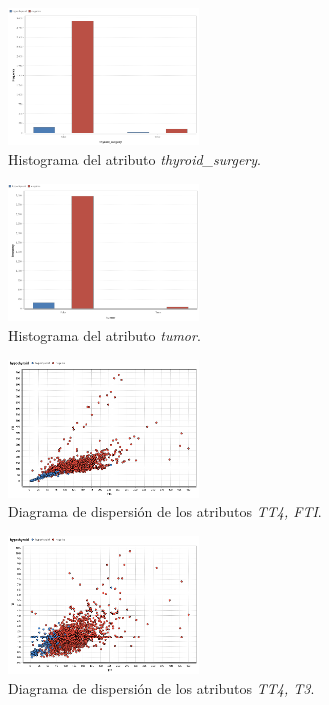 \documentclass[osajnl,twocolumn,showpacs,superscriptaddress,10pt,floatfix]{revtex4-1} %
\begin{document}
\begin{figure}[H]
    \centering
    \includegraphics[width=0.45\textwidth]{analysis/histogram_thyroid_surgery}
    \caption{Histograma del atributo \textit{thyroid\_surgery}.}
    \label{figure:thyroid_surgery}
\end{figure}

\begin{figure}[H]
    \centering
    \includegraphics[width=0.45\textwidth]{analysis/histogram_tumor}
    \caption{Histograma del atributo \textit{tumor}.}
    \label{figure:tumor}
\end{figure}

\begin{figure}[H]
    \centering
    \includegraphics[width=0.45\textwidth]{analysis/scatter_TT4_FTI}
    \caption{Diagrama de dispersión de los atributos \textit{TT4, FTI}.}
    \label{figure:scatter_TT4_FTI}
\end{figure}

\begin{figure}[H]
    \centering
    \includegraphics[width=0.45\textwidth]{analysis/scatter_TT4_T3}
    \caption{Diagrama de dispersión de los atributos \textit{TT4, T3}.}
    \label{figure:scatter_TT4_T3}
\end{figure}
\end{document}
